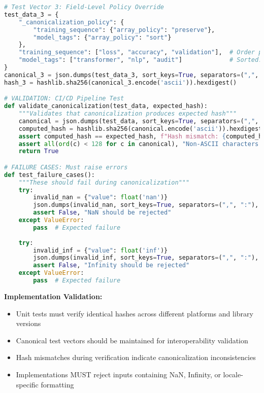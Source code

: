 \documentclass[12pt,a4paper]{article}
\begin{document}
\begin{technicalbox}
\begin{lstlisting}[language=Python, caption=ASCII-Compliant Canonicalization Test Vectors]
# Test Vector 3: Field-Level Policy Override
test_data_3 = {
    "_canonicalization_policy": {
        "training_sequence": {"array_policy": "preserve"},
        "model_tags": {"array_policy": "sort"}
    },
    "training_sequence": ["loss", "accuracy", "validation"],  # Order preserved
    "model_tags": ["transformer", "nlp", "audit"]             # Sorted: audit,nlp,transformer
}
canonical_3 = json.dumps(test_data_3, sort_keys=True, separators=(",", ":"), ensure_ascii=True)
hash_3 = hashlib.sha256(canonical_3.encode('ascii')).hexdigest()

# VALIDATION: CI/CD Pipeline Test
def validate_canonicalization(test_data, expected_hash):
    """Validates that canonicalization produces expected hash"""
    canonical = json.dumps(test_data, sort_keys=True, separators=(",", ":"), ensure_ascii=True)
    computed_hash = hashlib.sha256(canonical.encode('ascii')).hexdigest()
    assert computed_hash == expected_hash, f"Hash mismatch: {computed_hash} != {expected_hash}"
    assert all(ord(c) < 128 for c in canonical), "Non-ASCII characters detected"
    return True

# FAILURE CASES: Must raise errors
def test_failure_cases():
    """These should fail during canonicalization"""
    try:
        invalid_nan = {"value": float('nan')}
        json.dumps(invalid_nan, sort_keys=True, separators=(",", ":"), ensure_ascii=True)
        assert False, "NaN should be rejected"
    except ValueError:
        pass  # Expected failure
    
    try:
        invalid_inf = {"value": float('inf')}
        json.dumps(invalid_inf, sort_keys=True, separators=(",", ":"), ensure_ascii=True)
        assert False, "Infinity should be rejected"
    except ValueError:
        pass  # Expected failure
\end{lstlisting}

\textbf{Implementation Validation:}
\begin{itemize}
\item Unit tests must verify identical hashes across different platforms and library versions
\item Canonical test vectors should be maintained for interoperability validation
\item Hash mismatches during verification indicate canonicalization inconsistencies
\item Implementations MUST reject inputs containing NaN, Infinity, or locale-specific formatting
\end{itemize}


\end{technicalbox}
\end{document}
